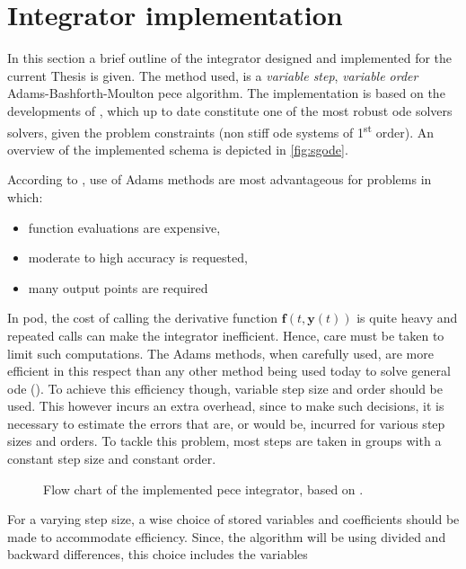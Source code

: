 \section{Integrator implementation}\label{sec:integrator-implementation}

In this section a brief outline of the integrator designed and implemented for 
the current Thesis is given. The method used, is a \emph{variable step}, 
\emph{variable order} Adams-Bashforth-Moulton \gls{pece} algorithm. The 
implementation is based on the developments of \cite{Shampine1975}, which up to 
date constitute one of the most robust \gls{ode} solvers solvers, given the 
problem constraints (non stiff \gls{ode} systems of 1\textsuperscript{st} order).
An overview of the implemented schema is depicted in \autoref{fig:sgode}.

According to \cite{Shampine1975}, use of Adams methods are most advantageous for 
problems in which:
\begin{itemize}\setlength\itemsep{.3em}
    \item function evaluations are expensive,
    \item moderate to high accuracy is requested,
    \item many output points are required
\end{itemize}

In \gls{pod}, the cost of calling the derivative function $\bm{f}(t, \bm{y}(t))$ 
is quite heavy and repeated calls can make the integrator inefficient. Hence, care 
must be taken to limit such computations. The Adams methods, when carefully used, 
are more efficient in this respect than any other method being used today to 
solve general \gls{ode} (\cite{Shampine1975}). To achieve this efficiency though, 
variable step size and order should be used. This however incurs an extra overhead, 
since to make such decisions, it is necessary to estimate the errors that are, 
or would be, incurred for various step sizes and orders. To tackle this problem, 
most steps are taken in groups with a constant step size and constant order.

\begin{figure}
  \centering
  
  \caption{Flow chart of the implemented \gls{pece} integrator, based 
    on \cite{Shampine1975}.}
  \label{fig:sgode}
\end{figure}

For a varying step size, a wise choice of stored variables and coefficients 
should be made to accommodate efficiency. Since, the algorithm will be using divided 
and backward differences, this choice includes the variables

